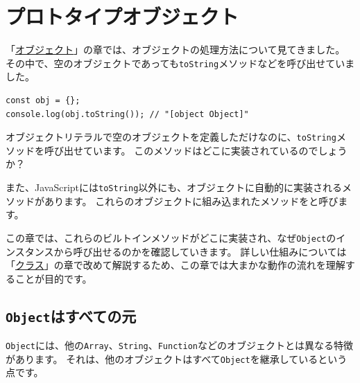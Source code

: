 \hypertarget{prototype-object}{%
\chapter{プロトタイプオブジェクト}\label{prototype-object}}
\thispagestyle{frontheadings}

「\href{../object/README.md}{オブジェクト}」の章では、オブジェクトの処理方法について見てきました。
その中で、空のオブジェクトであっても\texttt{toString}メソッドなどを呼び出せていました。

\begin{lstlisting}
const obj = {};
console.log(obj.toString()); // "[object Object]"
\end{lstlisting}

オブジェクトリテラルで空のオブジェクトを定義しただけなのに、\texttt{toString}メソッドを呼び出せています。
このメソッドはどこに実装されているのでしょうか？

また、JavaScriptには\texttt{toString}以外にも、オブジェクトに自動的に実装されるメソッドがあります。
これらのオブジェクトに組み込まれたメソッドを\textbf{}と呼びます。

この章では、これらのビルトインメソッドがどこに実装され、なぜ\texttt{Object}のインスタンスから呼び出せるのかを確認していきます。
詳しい仕組みについては「\hyperlink{class}{クラス}」の章で改めて解説するため、この章では大まかな動作の流れを理解することが目的です。

\hypertarget{object-is-origin}{%
\section{\texorpdfstring{\texttt{Object}はすべての元}{Objectはすべての元}}\label{object-is-origin}}

\texttt{Object}には、他の\texttt{Array}、\texttt{String}、\texttt{Function}などのオブジェクトとは異なる特徴があります。
それは、他のオブジェクトはすべて\texttt{Object}を継承しているという点です。


